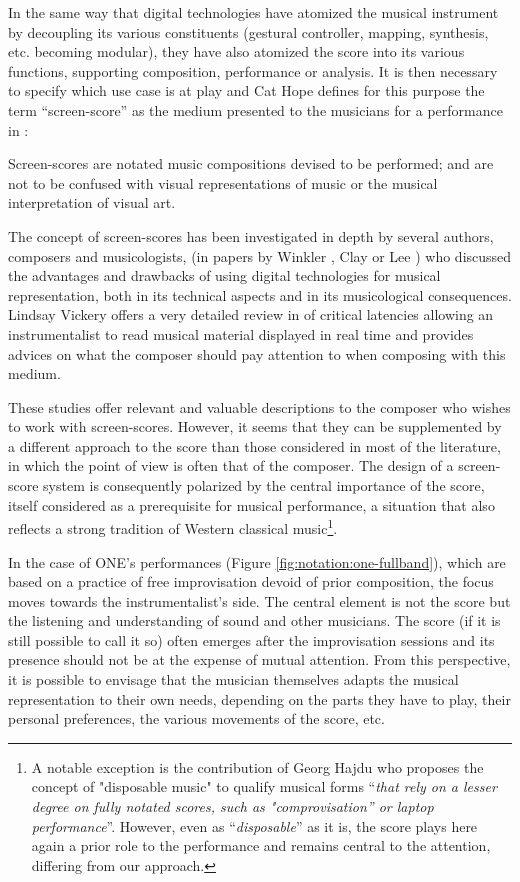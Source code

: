 In the same way that digital technologies have atomized the musical instrument by decoupling its various constituents (gestural controller, mapping, synthesis, etc. becoming modular), they have also atomized the score into its various functions, supporting composition, performance or analysis. It is then necessary to specify which use case is at play and Cat Hope defines for this purpose the term “screen-score” as the medium presented to the musicians for a performance in \cite{hope_screen_2011} :




Screen-scores are notated music compositions devised to be performed; and are not to be confused with visual representations of music or the musical interpretation of visual art.

The concept of screen-scores has been investigated in depth by several authors, composers and musicologists, (in papers by Winkler \cite{winkler_real-time_2004}, Clay \cite{adams_inventing_2008} or Lee \cite{lee_real-time_2012}) who discussed the advantages and drawbacks of using digital technologies for musical representation, both in its technical aspects and in its musicological consequences. Lindsay Vickery offers a very detailed review in \cite{vickery_limitations_2014} of critical latencies allowing an instrumentalist to read musical material displayed in real time and provides advices on what the composer should pay attention to when composing with this medium.

These studies offer relevant and valuable descriptions to the composer who wishes to work with screen-scores. However, it seems that they can be supplemented by a different approach to the score than those considered in most of the literature, in which the point of view is often that of the composer. The design of a screen-score system is consequently polarized by the central importance of the score, itself considered as a prerequisite for musical performance, a situation that also reflects a strong tradition of Western classical music\footnote{A notable exception is the contribution of Georg Hajdu \cite{hajdu_disposable_2016} who proposes the concept of "disposable music" to qualify musical forms “\textit{that rely on a lesser degree on fully notated scores, such as "comprovisation” or laptop performance}”. However, even as “\textit{disposable}” as it is, the score plays here again a prior role to the performance and remains central to the attention, differing from our approach.}.

In the case of ONE's performances (Figure \ref{fig:notation:one-fullband}), which are based on a practice of free improvisation devoid of prior composition, the focus moves towards the instrumentalist's side. The central element is not the score but the listening and understanding of sound and other musicians. The score (if it is still possible to call it so) often emerges after the improvisation sessions and its presence should not be at the expense of mutual attention. From this perspective, it is possible to envisage that the musician themselves adapts the musical representation to their own needs, depending on the parts they have to play, their personal preferences, the various movements of the score, etc.

